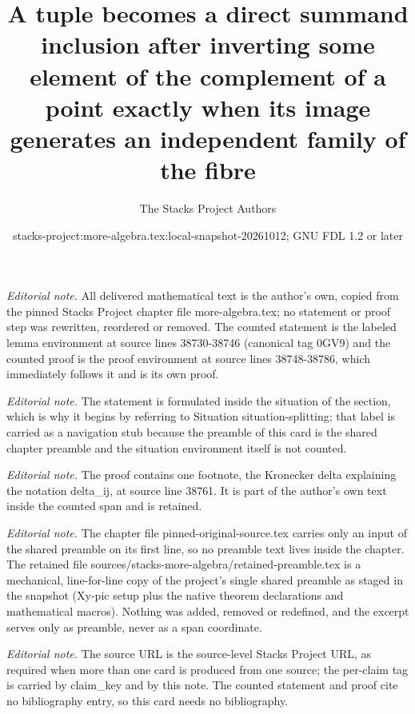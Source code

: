 \documentclass[10pt,a4paper]{amsart}
\title{A tuple becomes a direct summand inclusion after inverting some element of the complement of a point exactly when its image generates an independent family of the fibre}
\author{The Stacks Project Authors}
\date{stacks-project:more-algebra.tex:local-snapshot-20261012; GNU FDL 1.2 or later}
\theoremstyle{plain}
\theoremstyle{definition}
\theoremstyle{remark}
\numberwithin{equation}{subsection}
\begin{document}
\maketitle
\setcounter{subsection}{1}
\noindent\textit{Editorial note.} All delivered mathematical text is the author's own, copied from the pinned Stacks Project chapter file more-algebra.tex; no statement or proof step was rewritten, reordered or removed. The counted statement is the labeled lemma environment at source lines 38730-38746 (canonical tag 0GV9) and the counted proof is the proof environment at source lines 38748-38786, which immediately follows it and is its own proof.\par\medskip
\noindent\textit{Editorial note.} The statement is formulated inside the situation of the section, which is why it begins by referring to Situation situation-splitting; that label is carried as a navigation stub because the preamble of this card is the shared chapter preamble and the situation environment itself is not counted.\par\medskip
\noindent\textit{Editorial note.} The proof contains one footnote, the Kronecker delta explaining the notation delta\_ij, at source line 38761. It is part of the author's own text inside the counted span and is retained.\par\medskip
\noindent\textit{Editorial note.} The chapter file pinned-original-source.tex carries only an input of the shared preamble on its first line, so no preamble text lives inside the chapter. The retained file sources/stacks-more-algebra/retained-preamble.tex is a mechanical, line-for-line copy of the project's single shared preamble as staged in the snapshot (Xy-pic setup plus the native theorem declarations and mathematical macros). Nothing was added, removed or redefined, and the excerpt serves only as preamble, never as a span coordinate.\par\medskip
\noindent\textit{Editorial note.} The source URL is the source-level Stacks Project URL, as required when more than one card is produced from one source; the per-claim tag is carried by claim\_key and by this note. The counted statement and proof cite no bibliography entry, so this card needs no bibliography.\par\medskip
\end{document}
